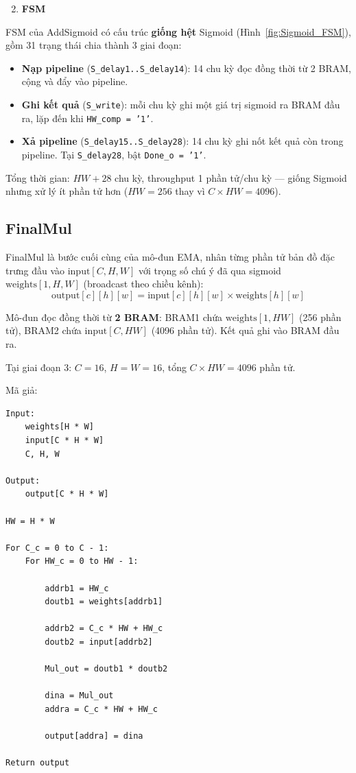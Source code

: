 \documentclass{uetgraduation}
\begin{document}
\begin{enumerate}
    \setcounter{enumi}{1}
    \item \textbf{FSM}
\end{enumerate}

FSM của AddSigmoid có cấu trúc \textbf{giống hệt} Sigmoid
(Hình~\ref{fig:Sigmoid_FSM}), gồm 31 trạng thái chia thành 3 giai
đoạn:
\begin{itemize}
    \item \textbf{Nạp pipeline} (\texttt{S\_delay1..S\_delay14}):
    14 chu kỳ đọc đồng thời từ 2 BRAM, cộng và đẩy vào pipeline.

    \item \textbf{Ghi kết quả} (\texttt{S\_write}): mỗi chu kỳ ghi
    một giá trị sigmoid ra BRAM đầu ra, lặp đến khi
    \texttt{HW\_comp = '1'}.

    \item \textbf{Xả pipeline} (\texttt{S\_delay15..S\_delay28}):
    14 chu kỳ ghi nốt kết quả còn trong pipeline. Tại
    \texttt{S\_delay28}, bật \texttt{Done\_o = '1'}.
\end{itemize}

Tổng thời gian: $HW + 28$ chu kỳ, throughput 1 phần tử/chu kỳ — giống
Sigmoid nhưng xử lý ít phần tử hơn ($HW = 256$ thay vì
$C \times HW = 4096$).

\subsection{FinalMul}
FinalMul là bước cuối cùng của mô-đun EMA, nhân từng phần tử bản đồ đặc trưng
đầu vào $\text{input}[C, H, W]$ với trọng số chú ý đã qua
sigmoid $\text{weights}[1, H, W]$ (broadcast theo chiều kênh):
\begin{equation}
    \text{output}[c][h][w] = \text{input}[c][h][w]
    \times \text{weights}[h][w]
\end{equation}

Mô-đun đọc đồng thời từ \textbf{2 BRAM}: BRAM1 chứa
$\text{weights}[1, HW]$ (256 phần tử), BRAM2 chứa
$\text{input}[C, HW]$ (4096 phần tử). Kết quả ghi vào BRAM đầu ra.

Tại giai đoạn 3: $C = 16$, $H = W = 16$, tổng $C \times HW = 4096$
phần tử.

Mã giả:
\begin{Verbatim}[frame=single]
Input:
    weights[H * W]
    input[C * H * W]
    C, H, W

Output:
    output[C * H * W]

HW = H * W

For C_c = 0 to C - 1:
    For HW_c = 0 to HW - 1:

        addrb1 = HW_c
        doutb1 = weights[addrb1]

        addrb2 = C_c * HW + HW_c
        doutb2 = input[addrb2]

        Mul_out = doutb1 * doutb2

        dina = Mul_out
        addra = C_c * HW + HW_c

        output[addra] = dina

Return output
\end{Verbatim}
\end{document}
